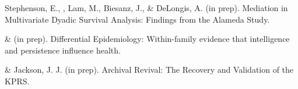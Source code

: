\item Stephenson, E., \meb, Lam, M., Biesanz, J., \& DeLongis, A. (in prep). Mediation in Multivariate Dyadic Survival Analysis: Findings from the Alameda Study. %
\item \meb \& \Joe (in prep). Differential Epidemiology: Within-family evidence that intelligence and persistence influence health.
\item \meb \& Jackson, J. J. (in prep). Archival Revival: The Recovery and Validation of the KPRS.
\vspace{-2mm}\begin{center}\end{center} \vspace{-4mm}